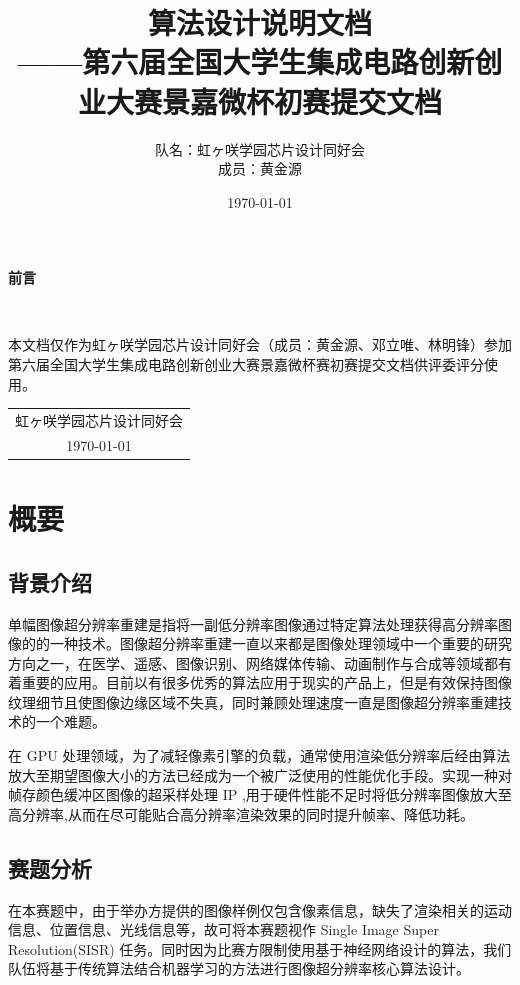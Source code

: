 \documentclass[12pt, a4paper, oneside]{ctexbook}
\title{{\Huge{\textbf{算法设计说明文档}}}\normalsize{\\——第六届全国大学生集成电路创新创业大赛景嘉微杯初赛提交文档}}
\author{队名：虹ヶ咲学园芯片设计同好会\\ 成员：黄金源\space邓立唯\space林明锋}
\date{\today}
\begin{document}
	
	
	
	\maketitle	
	\setcounter{page}{1}
	\begin{center}
		\Huge\textbf{前言}
	\end{center}~\
	
	本文档仅作为虹ヶ咲学园芯片设计同好会（成员：黄金源、邓立唯、林明锋）参加第六届全国大学生集成电路创新创业大赛景嘉微杯赛初赛提交文档供评委评分使用。
	~\\
	\begin{flushright}
		\begin{tabular}{c}
			虹ヶ咲学园芯片设计同好会\\
			\today
		\end{tabular}
	\end{flushright}
	\newpage
	\setcounter{page}{1}
	\tableofcontents
	\newpage
	\setcounter{page}{1}
	
	\chapter{概要}
	\section{背景介绍}
	单幅图像超分辨率重建是指将一副低分辨率图像通过特定算法处理获得高分辨率图像的的一种技术。图像超分辨率重建一直以来都是图像处理领域中一个重要的研究方向之一，在医学、遥感、图像识别、网络媒体传输、动画制作与合成等领域都有着重要的应用。目前以有很多优秀的算法应用于现实的产品上，但是有效保持图像纹理细节且使图像边缘区域不失真，同时兼顾处理速度一直是图像超分辨率重建技术的一个难题。\par 在 GPU 处理领域，为了减轻像素引擎的负载，通常使用渲染低分辨率后经由算法放大至期望图像大小的方法已经成为一个被广泛使用的性能优化手段。实现一种对帧存颜色缓冲区图像的超采样处理 IP ,用于硬件性能不足时将低分辨率图像放大至高分辨率,从而在尽可能贴合高分辨率渲染效果的同时提升帧率、降低功耗。
	\section{赛题分析}
	在本赛题中，由于举办方提供的图像样例仅包含像素信息，缺失了渲染相关的运动信息、位置信息、光线信息等，故可将本赛题视作 Single Image Super Resolution(SISR) 任务。同时因为比赛方限制使用基于神经网络设计的算法，我们队伍将基于传统算法结合机器学习的方法进行图像超分辨率核心算法设计。
	
\end{document}
